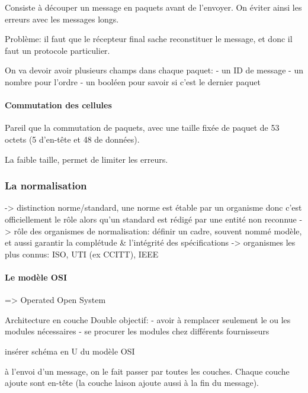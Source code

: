 Consiste à découper un message en paquets avant de l'envoyer. On éviter
ainsi les erreurs avec les messages longs.

Problème: il faut que le récepteur final sache reconstituer le message,
et donc il faut un protocole particulier.

On va devoir avoir plusieurs champs dans chaque paquet: - un ID de
message - un nombre pour l'ordre - un booléen pour savoir si c'est le
dernier paquet

\hypertarget{commutation-des-cellules}{%
\paragraph{Commutation des cellules}\label{commutation-des-cellules}}

Pareil que la commutation de paquets, avec une taille fixée de paquet de
53 octets (5 d'en-tête et 48 de données).

La faible taille, permet de limiter les erreurs.

\hypertarget{la-normalisation}{%
\subsubsection{La normalisation}\label{la-normalisation}}

-\textgreater{} distinction norme/standard, une norme est étable par un
organisme donc c'est officiellement le rôle alors qu'un standard est
rédigé par une entité non reconnue -\textgreater{} rôle des organismes
de normalisation: définir un cadre, souvent nommé modèle, et aussi
garantir la complétude \& l'intégrité des spécifications -\textgreater{}
organismes les plus connus: ISO, UTI (ex CCITT), IEEE

\hypertarget{le-moduxe8le-osi}{%
\paragraph{Le modèle OSI}\label{le-moduxe8le-osi}}

=\textgreater{} Operated Open System

Architecture en couche Double objectif: - avoir à remplacer seulement le
ou les modules nécessaires - se procurer les modules chez différents
fournisseurs

insérer schéma en U du modèle OSI

à l'envoi d'un message, on le fait passer par toutes les couches. Chaque
couche ajoute sont en-tête (la couche laison ajoute aussi à la fin du
message).

